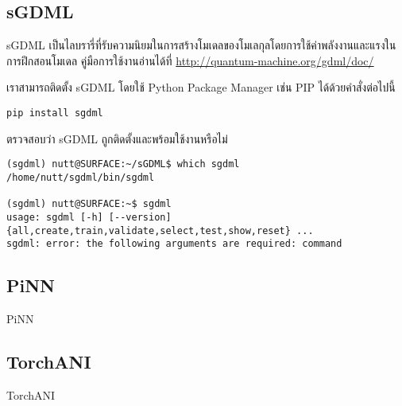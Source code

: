 \subsection{sGDML}

sGDML เป็นไลบรารี่ที่รับความนิยมในการสร้างโมเดลของโมเลกุลโดยการใช้ค่าพลังงานและแรงในการฝึกสอนโมเดล\autocite{chmiela2019}
คู่มือการใช้งานอ่านได้ที่ \url{http://quantum-machine.org/gdml/doc/}

\noindent เราสามารถติดตั้ง sGDML โดยใช้ Python Package Manager เช่น PIP ได้ด้วยคำสั่งต่อไปนี้

\begin{lstlisting}[style=MyBash]
pip install sgdml
\end{lstlisting}

\noindent ตรวจสอบว่า sGDML ถูกติดตั้งและพร้อมใช้งานหรือไม่

\begin{lstlisting}[style=MyBash]
(sgdml) nutt@SURFACE:~/sGDML$ which sgdml
/home/nutt/sgdml/bin/sgdml

(sgdml) nutt@SURFACE:~$ sgdml
usage: sgdml [-h] [--version] {all,create,train,validate,select,test,show,reset} ...
sgdml: error: the following arguments are required: command
\end{lstlisting}

\subsection{PiNN}

PiNN\autocite{shao2020}

\subsection{TorchANI}

TorchANI\autocite{gao2020}
